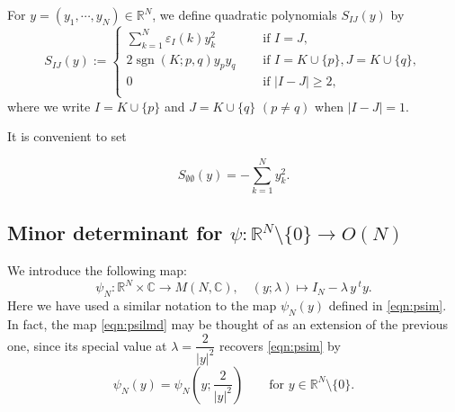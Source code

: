 For $y=(y_1,\cdots,y_N) \in {\mathbb{R}}^N$, 
 we define quadratic polynomials 
$
S_{I J}(y)
$ 
by 
\begin{equation}
\label{eqn:SIJ}
S_{I J}(y)
:=
\begin{cases}
\sum_{k=1}^{N} \varepsilon_I(k) y_k^2
\quad
&\text{ if } I =J, 
\\
2 \operatorname{sgn}(K;p,q) y_p y_q
\quad
&\text{ if } I = K \cup \{p\}, J = K \cup \{q\}, 
\\
0
\quad
&\text{ if } |I- J| \ge 2, 
\\
\end{cases}
\end{equation}
where we write $I=K \cup \{p\}$
 and $J=K \cup \{q\}$
 $(p \ne q)$
 when $|I - J|=1$.  

It is convenient to set

\begin{equation}
\label{eqn:Sempty}
S_{\emptyset \emptyset}(y)=-\sum_{k=1}^N y_k^2.  
\end{equation}

\subsection{Minor determinant 
 for $\psi:{\mathbb{R}}^N \setminus \{0\}\to O(N)$
}
\label{subsec:psiN}

We introduce the following map:
\begin{equation}
\label{eqn:psilmd}
\psi_N \colon \mathbb{R}^N \times {\mathbb{C}}
        \to M(N,{\mathbb{C}}),
\quad
(y; \lambda) \mapsto I_N - \lambda\, y \, {}^t \! y.  
\end{equation}
Here we have used a similar notation to the map $\psi_N(y)$ defined in \eqref{eqn:psim}.  
In fact,
 the map \eqref{eqn:psilmd} may be thought of as an extension
 of the previous one,
 since its special value 
 at $\lambda = \dfrac{2}{|y|^2}$ recovers \eqref{eqn:psim} by 
\begin{equation}
   \psi_N(y)=\psi_N(y;\frac{2}{|y|^2})
\qquad
\text{for $y \in {\mathbb{R}}^N \setminus \{0\}$}.  
\end{equation}
  



